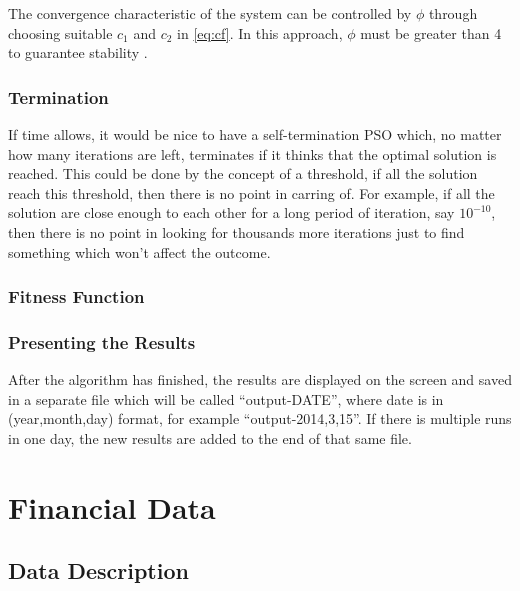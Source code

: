 \documentclass{pdfmx4020}
\begin{document}
    The convergence characteristic of the system can be controlled by $\phi$ through choosing suitable $c_1$ and $c_2$ in \eqref{eq:cf}. In this approach, $\phi$ must be greater than 4 to guarantee stability \cite{constriction_factor_2}.
    \subsection{Termination} %
    \label{sub:termination}
    If time allows, it would be nice to have a self-termination PSO which, no matter how many iterations are left, terminates if it thinks that the optimal solution is reached. This could be done by the concept of a threshold, if all the solution reach this threshold, then there is no point in carring of. For example, if all the solution are close enough to each other for a long period of iteration, say $10^{-10}$, then there is no point in looking for thousands more iterations just to find something which won't affect the outcome. 
    \subsection{Fitness Function} %
    \label{sub:fitness_function}
    
    \subsection{Presenting the Results} %
    \label{sub:presenting_the_results}
    After the algorithm has finished, the results are displayed on the screen and saved in a separate file which will be called ``output-DATE'', where date is in (year,month,day) format, for example ``output-2014,3,15''. If there is multiple runs in one day, the new results are added to the end of that same file.


\chapter{Financial Data}
  \section{Data Description} %
  \label{sec:data_description}
  
\end{document}
